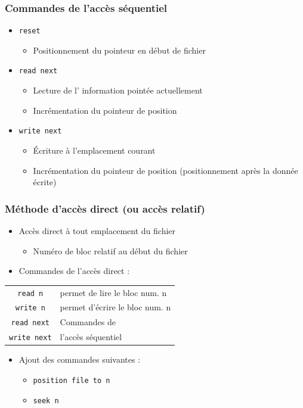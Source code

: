 \begin{frame}
\frametitle{Commandes de l'accès séquentiel}
\begin{itemize}
\item \texttt{reset}
\begin{itemize}
\item Positionnement du pointeur en début de fichier
\end{itemize}
\item \texttt{read next}
\begin{itemize}
\item Lecture de l' information pointée actuellement
\item Incrémentation du pointeur de position
\end{itemize}
\item \texttt{write next}
\begin{itemize}
\item Écriture à l'emplacement courant
\item Incrémentation du pointeur de position (positionnement après la donnée écrite)
\end{itemize}
\end{itemize}
\end{frame}

\begin{frame}
\frametitle{Méthode d'accès direct (ou accès relatif)}
\begin{itemize}
\item Accès direct à tout emplacement du fichier
\begin{itemize}
  \item Numéro de bloc relatif au début du fichier
\end{itemize}
\item Commandes de l'accès direct :
\end{itemize}
\begin{tabular}{c|l}
\texttt{read n} & permet de lire le bloc num. n \\
\texttt{write n} & permet d'écrire le bloc num. n \\
\texttt{read next}	&	Commandes de \\
\texttt{write next}	&	l'accès séquentiel \\
\end{tabular}
\begin{itemize}
\item Ajout des commandes suivantes :
\begin{itemize}
\item \texttt{position file to n}
\item \texttt{seek n}
\end{itemize}
\end{itemize}
\end{frame}


